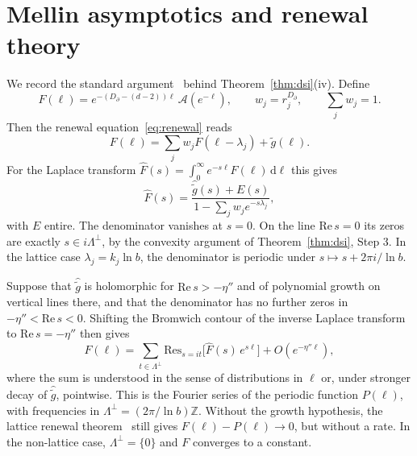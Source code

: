 \documentclass[11pt]{article}
\theoremstyle{definition}\newtheorem{definition}{Definition}[section]
\theoremstyle{remark}\newtheorem*{remark}{Remark}
\newcommand{\cA}{\mathcal{A}}
\newcommand{\ZZ}{\mathbb{Z}}
\newcommand{\dd}{\mathrm{d}}
\begin{document}
\section{Mellin asymptotics and renewal theory}
\label{app:renewal}
We record the standard argument~\cite{Feller,LvF} behind Theorem~\ref{thm:dsi}(iv). Define
\begin{equation}
F(\ell)=e^{-(D_\partial-(d-2))\ell}\,\cA(e^{-\ell}),\qquad w_j=r_j^{D_\partial},\qquad \sum_jw_j=1 .
\end{equation}
Then the renewal equation~\eqref{eq:renewal} reads
\begin{equation}
F(\ell)=\sum_jw_jF(\ell-\lambda_j)+\tilde g(\ell).
\end{equation}
For the Laplace transform
$\widehat F(s)=\int_0^\infty e^{-s\ell}F(\ell)\,\dd\ell$ this gives
\begin{equation}
\widehat F(s)=\frac{\widehat{\tilde g}(s)+E(s)}{1-\sum_jw_je^{-s\lambda_j}},
\end{equation}
with $E$ entire. The denominator vanishes at $s=0$. On the line $\mathrm{Re}\,s=0$ its zeros are exactly
$s\in i\Lambda^\perp$, by the convexity argument of Theorem~\ref{thm:dsi}, Step 3. In the lattice case
$\lambda_j=k_j\ln b$, the denominator is periodic under $s\mapsto s+2\pi i/\ln b$.

Suppose that $\widehat{\tilde g}$ is holomorphic for $\mathrm{Re}\,s>-\eta''$ and of polynomial growth on
vertical lines there, and that the denominator has no further zeros in $-\eta''<\mathrm{Re}\,s<0$. Shifting
the Bromwich contour of the inverse Laplace transform to $\mathrm{Re}\,s=-\eta''$ then gives
\begin{equation}
F(\ell)=\sum_{t\in\Lambda^\perp}\mathrm{Res}_{s=it}\big[\widehat F(s)\,e^{s\ell}\big]+O(e^{-\eta''\ell}),
\end{equation}
where the sum is understood in the sense of distributions in $\ell$ or, under stronger decay of
$\widehat{\tilde g}$, pointwise. This is the Fourier series of the periodic function $P(\ell)$, with
frequencies in $\Lambda^\perp=(2\pi/\ln b)\ZZ$. Without the growth hypothesis, the lattice renewal
theorem~\cite{Feller} still gives $F(\ell)-P(\ell)\to0$, but without a rate. In the non-lattice case,
$\Lambda^\perp=\{0\}$ and $F$ converges to a constant.
\end{document}
